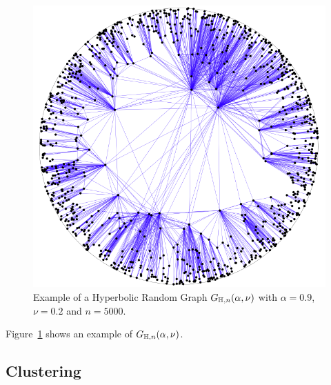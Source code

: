 \begin{figure}[!t]
\centering
\includegraphics[scale=0.3]{figures/KPKVB.png}
\caption{Example of a Hyperbolic Random Graph $G_{\mathbb{H},n}(\alpha, \nu)$ with $\alpha = 0.9$, $\nu = 0.2$ and $n = 5000$.
}
\label{fig:H_graph_example}
\end{figure}



Figure~\ref{fig:H_graph_example} shows an example of $G_{\mathbb{H},n}(\alpha, \nu)$.






\subsection{Clustering}\label{ssec:local_clustering}


